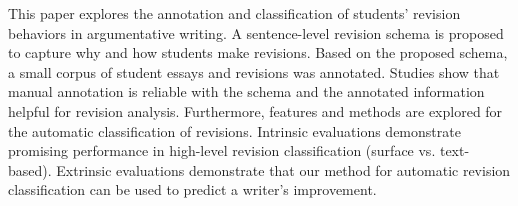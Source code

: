 This paper explores the annotation and classification of students' revision behaviors in argumentative writing. A  sentence-level revision schema is proposed to capture why and how students make revisions. Based on the proposed schema, a small corpus of student essays and revisions was annotated. Studies show that manual annotation is reliable with the schema and the annotated information  helpful for revision analysis. Furthermore, features and methods are explored for the automatic classification of revisions. Intrinsic evaluations demonstrate promising performance in high-level revision classification (surface vs. text-based). Extrinsic evaluations demonstrate that our method for automatic revision classification can be used to predict a writer's improvement.
